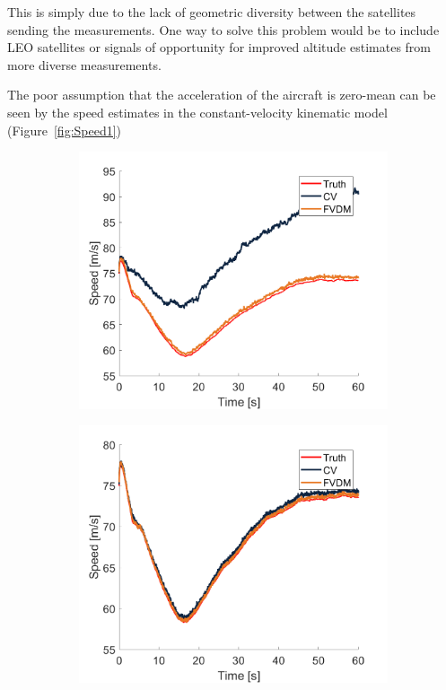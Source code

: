 This is simply due to the lack of geometric diversity between the satellites sending the measurements. One way to solve this problem would be to include LEO satellites or signals of opportunity for improved altitude estimates from more diverse measurements.

The poor assumption that the acceleration of the aircraft is zero-mean can be seen by the speed estimates in the constant-velocity kinematic model (Figure~\ref{fig:Speed1})

\begin{figure}[!ht]
    \begin{subfigure}{.45\textwidth}
        \centering
        \includegraphics[width=1\linewidth]{Figures/straight/20/SPEED.png}
    \end{subfigure}
    \begin{subfigure}{.45\textwidth}
        \centering
        \includegraphics[width=1\linewidth]{Figures/straight/25/SPEED.png}

\end{subfigure}
\end{figure}
